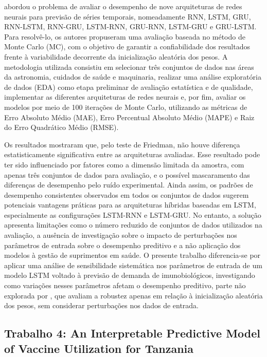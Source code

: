\documentclass[
    12pt,                %
    openright,           %
    oneside,             %
    a4paper,             %
    english,             %
    brazil               %
]{abntex2}
\begin{document}
 abordou o problema de avaliar o desempenho de nove arquiteturas de redes neurais para previsão de séries temporais, nomeadamente RNN, LSTM, GRU, RNN-LSTM, RNN-GRU, LSTM-RNN, GRU-RNN, LSTM-GRU e GRU-LSTM. Para resolvê-lo, os autores propuseram uma avaliação baseada no método de Monte Carlo (MC), com o objetivo de garantir a confiabilidade dos resultados frente à variabilidade decorrente da inicialização aleatória dos pesos. A metodologia utilizada consistiu em selecionar três conjuntos de dados nas áreas da astronomia, cuidados de saúde e maquinaria, realizar uma análise exploratória de dados (EDA) como etapa preliminar de avaliação estatística e de qualidade, implementar as diferentes arquiteturas de redes neurais e, por fim, avaliar os modelos por meio de 100 iterações de Monte Carlo, utilizando as métricas de Erro Absoluto Médio (MAE), Erro Percentual Absoluto Médio (MAPE) e Raiz do Erro Quadrático Médio (RMSE).

Os resultados mostraram que, pelo teste de Friedman, não houve diferença estatisticamente significativa entre as arquiteturas avaliadas. Esse resultado pode ter sido influenciado por fatores como a dimensão limitada da amostra, com apenas três conjuntos de dados para avaliação, e o possível mascaramento das diferenças de desempenho pelo ruído experimental. Ainda assim, os padrões de desempenho consistentes observados em todos os conjuntos de dados sugerem potenciais vantagens práticas para as arquiteturas híbridas baseadas em LSTM, especialmente as configurações LSTM-RNN e LSTM-GRU. No entanto, a solução apresenta limitações como o número reduzido de conjuntos de dados utilizados na avaliação, a ausência de investigação sobre o impacto de perturbações nos parâmetros de entrada sobre o desempenho preditivo e a não aplicação dos modelos à gestão de suprimentos em saúde. O presente trabalho diferencia-se por aplicar uma análise de sensibilidade sistemática nos parâmetros de entrada de um modelo LSTM voltado à previsão de demanda de imunobiológicos, investigando como variações nesses parâmetros afetam o desempenho preditivo, parte não explorada por , que avaliam a robustez apenas em relação à inicialização aleatória dos pesos, sem considerar perturbações nos dados de entrada.

\subsection{Trabalho 4: An Interpretable Predictive Model of Vaccine Utilization for Tanzania}
\end{document}
